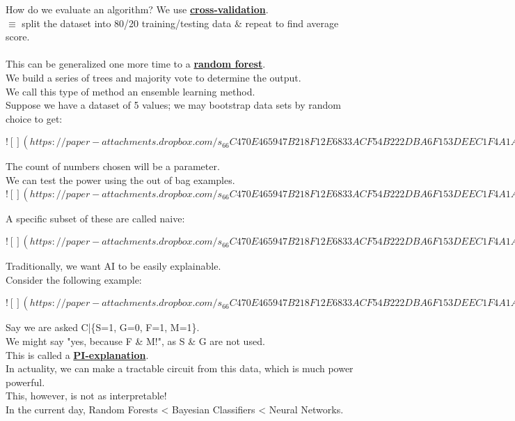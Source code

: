 \documentclass[../../lecture_notes.tex]{subfiles}
\begin{document}
\noindent How do we evaluate an algorithm? We use \textbf{\underline{cross-validation}}.\\
	\indent $\equiv$ split the dataset into 80/20 training/testing data \& repeat to find average score.\\
\\
This can be generalized one more time to a \textbf{\underline{random forest}}.\\
\indent We build a series of trees and majority vote to determine the output.\\
We call this type of method an ensemble learning method.\\

\noindent Suppose we have a dataset of 5 values; we may bootstrap data sets by random choice to get:

\newpage
$![](https://paper-attachments.dropbox.com/s_66C470E465947B218F12E6833ACF54B222DBA6F153DEEC1F4A1A4D06909A7A0F_1590987081685_Untitled+drawing+16.jpg)$
\newpage

\noindent The count of numbers chosen will be a parameter.\\
We can test the power using the out of bag examples.\\

\newpage
$![](https://paper-attachments.dropbox.com/s_66C470E465947B218F12E6833ACF54B222DBA6F153DEEC1F4A1A4D06909A7A0F_1590987481637_Untitled+drawing+17.jpg)$
\newpage

\noindent A specific subset of these are called naive:

\newpage
$![](https://paper-attachments.dropbox.com/s_66C470E465947B218F12E6833ACF54B222DBA6F153DEEC1F4A1A4D06909A7A0F_1590988064834_Untitled+drawing+19.jpg)$
\newpage

\noindent Traditionally, we want AI to be easily explainable.\\
Consider the following example:

\newpage
$![](https://paper-attachments.dropbox.com/s_66C470E465947B218F12E6833ACF54B222DBA6F153DEEC1F4A1A4D06909A7A0F_1590988346381_Untitled+drawing+20.jpg)$
\newpage

\noindent Say we are asked C|\{S=1, G=0, F=1, M=1\}.\\
We might say "yes, because F \& M!", as S \& G are not used.\\
This is called a \textbf{\underline{PI-explanation}}.\\
In actuality, we can make a tractable circuit from this data, which is much power powerful.\\
This, however, is not as interpretable!\\
In the current day, Random Forests < Bayesian Classifiers < Neural Networks.
\end{document}
